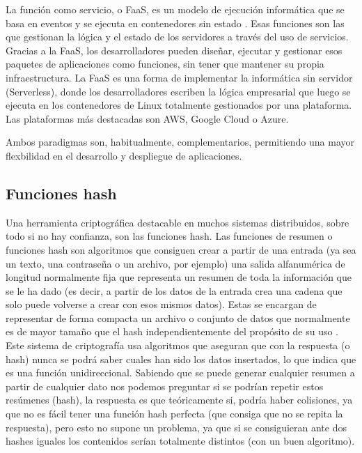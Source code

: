 \documentclass[11pt]{article}
\begin{document}
			La función como servicio, o FaaS, es un modelo de ejecución informática que se basa en eventos y se ejecuta en contenedores sin estado \cite{faas}. 
			Esas funciones son las que gestionan la lógica y el estado de los servidores a través del uso de servicios. Gracias a la FaaS, los desarrolladores pueden diseñar, ejecutar y gestionar esos paquetes de
			aplicaciones como funciones, sin tener que mantener su propia infraestructura.
			La FaaS es una forma de implementar la informática sin servidor (Serverless), donde los desarrolladores escriben la lógica empresarial que luego se ejecuta en los contenedores de Linux totalmente
			gestionados por una plataforma. Las plataformas más destacadas son AWS, Google Cloud o Azure.

			Ambos paradigmas son, habitualmente, complementarios, permitiendo una mayor flexbilidad en el desarrollo y despliegue de aplicaciones. \\

		\subsection{Funciones hash}
			Una herramienta criptográfica destacable en muchos sistemas distribuidos, sobre todo si no hay confianza, son las funciones hash.
			Las funciones de resumen o funciones hash son algoritmos que consiguen crear a partir de una entrada (ya sea un texto, una contraseña o un archivo, por ejemplo) 
			una salida alfanumérica de longitud normalmente fija que representa un resumen de toda la información que se le ha dado 
			(es decir, a partir de los datos de la entrada crea una cadena que solo puede volverse a crear con esos mismos datos).
			Estas se encargan de representar de forma compacta un archivo o conjunto de datos que normalmente es de mayor tamaño que el hash independientemente del propósito de su uso \cite{hash-function}. \\

			Este sistema de criptografía usa algoritmos que aseguran que con la respuesta (o hash) nunca se podrá saber cuales han sido los datos insertados, 
			lo que indica que es una función unidireccional. Sabiendo que se puede generar cualquier resumen a partir de cualquier dato nos podemos preguntar si se podrían repetir estos resúmenes (hash), 
			la respuesta es que teóricamente si, podría haber colisiones, ya que no es fácil tener una función hash perfecta (que consiga que no se repita la respuesta), pero esto no supone un problema,
			ya que si se consiguieran ante dos hashes iguales los contenidos serían totalmente distintos (con un buen algoritmo). \\
			
\end{document}
